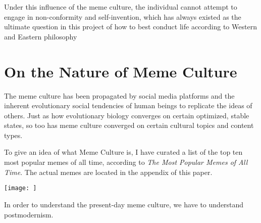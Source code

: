 \documentclass[12pt,letterpaper]{article}
\begin{document}
Under this influence of the meme culture, the individual cannot attempt to engage in non-conformity and self-invention, which has always existed as the ultimate question in this project of how to best conduct life according to Western and Eastern philosophy



%



\section{On the Nature of Meme Culture}

The meme culture has been propagated by social media platforms and the inherent evolutionary social tendencies of human beings to replicate the ideas of others.  Just as how evolutionary biology converges on certain optimized, stable states, so too has meme culture converged on certain cultural topics and content types.

To give an idea of what Meme Culture is, I have curated a list of the top ten most popular memes of all time, according to \textit{The Most Popular Memes of All Time}.  The actual memes are located in the appendix of this paper.

\texttt{[image: ]}





In order to understand the present-day meme culture, we have to understand postmodernism.
\end{document}

